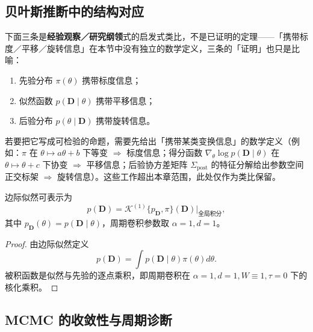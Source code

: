 \subsection{贝叶斯推断中的结构对应}

\begin{remark}\label{thm:bayesian_grammar_correspondence}
下面三条是\textbf{经验观察／研究纲领}式的启发式类比，不是已证明的定理——「携带标度／平移／旋转信息」在本节中没有独立的数学定义，三条的「证明」也只是比喻：
\begin{enumerate}[label=(\roman*)]
    \item 先验分布 $\pi(\theta)$ 携带标度信息；
    \item 似然函数 $p(\mathbf D\mid\theta)$ 携带平移信息；
    \item 后验分布 $p(\theta\mid\mathbf D)$ 携带旋转信息。
\end{enumerate}
若要把它写成可检验的命题，需要先给出「携带某类变换信息」的数学定义（例如：$\pi$ 在 $\theta\mapsto a\theta+b$ 下等变 $\Rightarrow$ 标度信息；得分函数 $\nabla_\theta\log p(\mathbf D\mid\theta)$ 在 $\theta\mapsto\theta+c$ 下协变 $\Rightarrow$ 平移信息；后验协方差矩阵 $\Sigma_{\mathrm{post}}$ 的特征分解给出参数空间正交标架 $\Rightarrow$ 旋转信息）。这些工作超出本章范围，此处仅作为类比保留。
\end{remark}

\begin{proposition}[边际似然的周期卷积表示]\label{prop:marginal_likelihood_periodic_transform}
边际似然可表示为
\[
p(\mathbf D)=\mathcal K^{(1)}\{p_{\mathbf D},\pi\}(\mathbf D)\big|_{\text{全局积分}},
\]
其中 $p_{\mathbf D}(\theta)=p(\mathbf D\mid\theta)$，周期卷积参数取 $\alpha=1,d=1$。
\end{proposition}

\begin{proof}
由边际似然定义
\[
p(\mathbf D)=\int p(\mathbf D\mid\theta)\pi(\theta)d\theta.
\]
被积函数是似然与先验的逐点乘积，即周期卷积在 $\alpha=1,d=1,W\equiv1,\tau=0$ 下的核化乘积。
\end{proof}

\subsection{MCMC 的收敛性与周期诊断}

